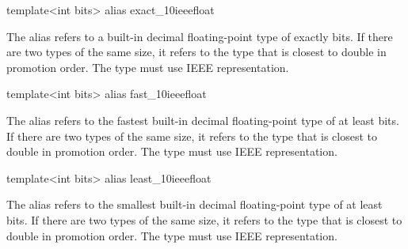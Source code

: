 \begin{addedblock}
\begin{itemdecl}
template<int bits> alias exact_10ieeefloat
\end{itemdecl}

\begin{itemdescr}
The alias  refers to a built-in decimal floating-point type of exactly  bits. If there are two types of the same size, it refers to the type that is closest to double in promotion order. The type must use IEEE representation.
\end{itemdescr}

\begin{itemdecl}
template<int bits> alias fast_10ieeefloat
\end{itemdecl}

\begin{itemdescr}
The alias  refers to the fastest built-in decimal floating-point type of at least  bits. If there are two types of the same size, it refers to the type that is closest to double in promotion order. The type must use IEEE representation.
\end{itemdescr}

\begin{itemdecl}
template<int bits> alias least_10ieeefloat
\end{itemdecl}

\begin{itemdescr}
The alias  refers to the smallest built-in decimal floating-point type of at least  bits. If there are two types of the same size, it refers to the type that is closest to double in promotion order. The type must use IEEE representation.
\end{itemdescr}   
\end{addedblock}